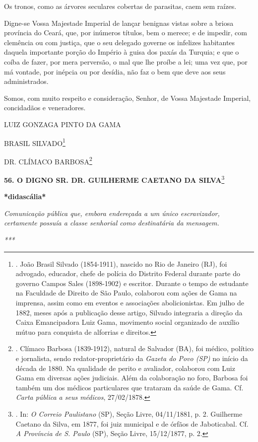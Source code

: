 Os tronos, como as árvores seculares cobertas de parasitas, caem sem
raízes.

Digne-se Vossa Majestade Imperial de lançar benignas vistas sobre a
briosa província do Ceará, que, por inúmeros títulos, bem o merece; e de
impedir, com clemência ou com justiça, que o seu delegado governe os
infelizes habitantes daquela importante porção do Império à guisa dos
paxás da Turquia; e que o coíba de fazer, por mera perversão, o mal que
lhe proíbe a lei; uma vez que, por má vontade, por inépcia ou por
desídia, não faz o bem que deve aos seus administrados.

Somos, com muito respeito e consideração, Senhor, de Vossa Majestade
Imperial, concidadãos e veneradores.

LUIZ GONZAGA PINTO DA GAMA

BRASIL SILVADO\footnote{. João Brasil Silvado (1854-1911), nascido no
  Rio de Janeiro (RJ), foi advogado, educador, chefe de polícia do
  Distrito Federal durante parte do governo Campos Sales (1898-1902) e
  escritor. Durante o tempo de estudante na Faculdade de Direito de São
  Paulo, colaborou com ações de Gama na imprensa, assim como em eventos
  e associações abolicionistas. Em julho de 1882, meses após a
  publicação desse artigo, Silvado integraria a direção da Caixa
  Emancipadora Luiz Gama, movimento social organizado de auxílio mútuo
  para conquista de alforrias e direitos.}

DR. CLÍMACO BARBOSA\footnote{. Clímaco Barbosa (1839-1912), natural de
  Salvador (BA), foi médico, político e jornalista, sendo
  redator-proprietário da \emph{Gazeta do Povo (SP)} no início da década
  de 1880. Na qualidade de perito e avaliador, colaborou com Luiz Gama
  em diversas ações judiciais. Além da colaboração no foro, Barbosa foi
  também um dos médicos particulares que trataram da saúde de Gama. Cf.
  \emph{Carta pública a seus médicos}, 27/02/1878.}

\textbf{56. O DIGNO SR. DR. GUILHERME CAETANO DA SILVA}\footnote{. In:
  \emph{O Correio Paulistano} (SP), Seção Livre, 04/11/1881, p. 2.
  Guilherme Caetano da Silva, em 1877, foi juiz municipal e de órfãos de
  Jaboticabal. Cf. \emph{A Província de S. Paulo} (SP), Seção Livre,
  15/12/1877, p. 2.}

\textbf{*}\textbf{didascália*}

\emph{Comunicação pública que, embora endereçada a um único
escravizador, certamente possuía a classe senhorial como destinatária da
mensagem.}

\emph{***}

